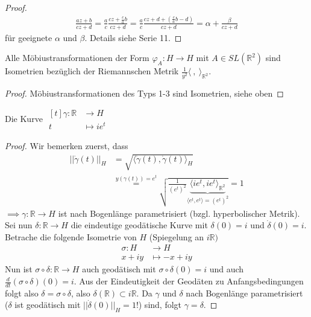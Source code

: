 \documentclass[../main.tex]{subfiles}
\begin{document}
\begin{proof}
    \begin{align*}
        \frac{az +b}{cz+d} =\frac{a}{c} \frac{cz+\frac{c}{a}b}{cz +d}=\frac{a}{c}\frac{cz+d+(\frac{c}{a}b-d)}{cz+d}
        = \alpha + \frac{\beta}{cz+d}
    \end{align*} für geeignete $\alpha$ und $\beta$.
    Details siehe Serie 11.
\end{proof}
\begin{corollary}
    Alle Möbiustransformationen der Form $\varphi _A : H \to H$ mit $A \in SL(\mathbb{R}^2)$
    sind Isometrien bezüglich der Riemannschen Metrik $\frac{1}{y^2}\langle \ , \ \rangle _{\mathbb{R}^2}$.
\end{corollary}
\begin{proof}
    Möbiustransformationen des Typs 1-3 sind Isometrien, siehe oben
\end{proof}
\begin{lemma}
    Die Kurve $\begin{aligned}[t]
        \gamma : \mathbb{R} & \to H \\
        t & \mapsto i e^t
    \end{aligned}$
\end{lemma}

\begin{proof}
    Wir bemerken zuerst, dass
    \begin{align*}
        || \dot{\gamma}(t)||_H &= \sqrt{\langle \dot{\gamma}(t), \dot{\gamma}(t)\rangle _H} \\
        &\overset{y(\gamma(t))=e^t}{=} \sqrt{\frac{1}{(e^t)^2} \underbrace{\langle i e^t, i e ^t \rangle _{\mathbb{R}^2}}_{\langle e^t, e^t \rangle = (e^t)^2}}=1
    \end{align*}
    $\implies \gamma :\mathbb{R}\to H $ ist nach Bogenlänge parametrisiert (bzgl. hyperbolischer Metrik).
    Sei nun $\delta : \mathbb{R} \to H$ die eindeutige geodätische Kurve mit
    $\delta (0) =i$ und $\dot{\delta}(0)=i$.
    Betrache die folgende Isometrie von $H$ (Spiegelung an $i \mathbb{R})$
    \begin{align*}
        \sigma : H & \to H \\
        x +iy & \mapsto -x + iy
    \end{align*}
    Nun ist $\sigma \circ \delta :\mathbb{R}\to H$ auch geodätisch mit $\sigma \circ \delta(0)=i$
    und auch $\frac{d}{dt}(\sigma \circ \delta)(0)=i$.
    Aus der Eindeutigkeit der Geodäten zu Anfangsbedingungen folgt also $\delta = \sigma \circ \delta$,
    also $\delta (\mathbb{R}) \subset i \mathbb{R}$.
    Da $\gamma$ und $\delta $ nach Bogenlänge parametrisiert ($\delta$ ist geodätisch mit $||\dot{\delta}(0)||_H =1$!) sind, folgt $\gamma = \delta$. 
\end{proof}
\end{document}
